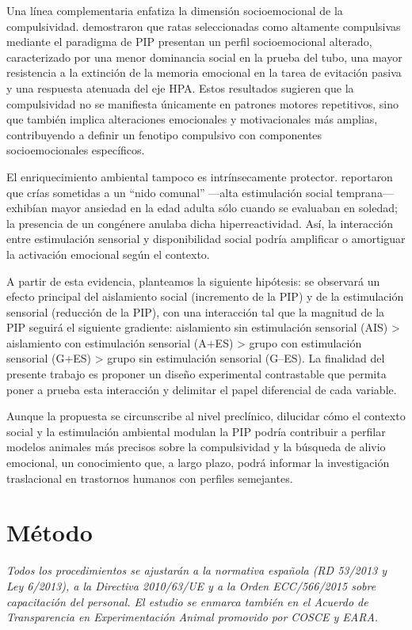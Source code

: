 \documentclass[12pt,a4paper]{article}
\begin{document}
\begin{multicols}{2}
Una línea complementaria enfatiza la dimensión socioemocional de la compulsividad. \citet{MartinGonzalez2022} demostraron que ratas seleccionadas como altamente compulsivas mediante el paradigma de PIP presentan un perfil socioemocional alterado, caracterizado por una menor dominancia social en la prueba del tubo, una mayor resistencia a la extinción de la memoria emocional en la tarea de evitación pasiva y una respuesta atenuada del eje HPA. Estos resultados sugieren que la compulsividad no se manifiesta únicamente en patrones motores repetitivos, sino que también implica alteraciones emocionales y motivacionales más amplias, contribuyendo a definir un fenotipo compulsivo con componentes socioemocionales específicos.

El enriquecimiento ambiental tampoco es intrínsecamente protector. \citet{Branchi2006} reportaron que crías sometidas a un “nido comunal” —alta estimulación social temprana— exhibían mayor ansiedad en la edad adulta sólo cuando se evaluaban en soledad; la presencia de un congénere anulaba dicha hiperreactividad. Así, la interacción entre estimulación sensorial y disponibilidad social podría amplificar o amortiguar la activación emocional según el contexto.

A partir de esta evidencia, planteamos la siguiente hipótesis: se observará un efecto principal del aislamiento social (incremento de la PIP) y de la estimulación sensorial (reducción de la PIP), con una interacción tal que la magnitud de la PIP seguirá el siguiente gradiente: aislamiento sin estimulación sensorial (AIS) > aislamiento con estimulación sensorial (A+ES) > grupo con estimulación sensorial (G+ES) > grupo sin estimulación sensorial (G–ES). La finalidad del presente trabajo es proponer un diseño experimental contrastable que permita poner a prueba esta interacción y delimitar el papel diferencial de cada variable.

Aunque la propuesta se circunscribe al nivel preclínico, dilucidar cómo el contexto social y la estimulación ambiental modulan la PIP podría contribuir a perfilar modelos animales más precisos sobre la compulsividad y la búsqueda de alivio emocional, un conocimiento que, a largo plazo, podrá informar la investigación traslacional en trastornos humanos con perfiles semejantes.


\section{Método}

\textit{Todos los procedimientos se ajustarán a la normativa española (RD 53/2013 y Ley 6/2013), a la Directiva 2010/63/UE y a la Orden ECC/566/2015 sobre capacitación del personal. El estudio se enmarca también en el Acuerdo de Transparencia en Experimentación Animal promovido por COSCE y EARA.}


\end{multicols}
\end{document}
